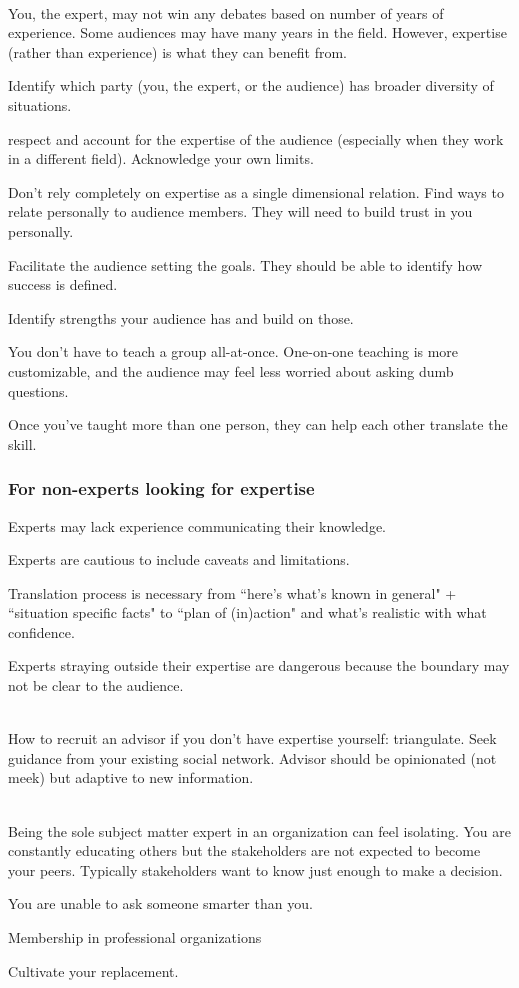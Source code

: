 \ \\

You, the expert, may not win any debates based on number of years of experience. Some audiences may have many years in the field. However, expertise (rather than experience) is what they can benefit from. 

Identify which party (you, the expert, or the audience) has broader diversity of situations.

respect and account for the expertise of the audience (especially when they work in a different field). Acknowledge your own limits.

Don't rely completely on expertise as a single dimensional relation. Find ways to relate personally to audience members. They will need to build trust in you personally.

Facilitate the audience setting the goals. They should be able to identify how success is defined.

Identify strengths your audience has and build on those.

You don't have to teach a group all-at-once. One-on-one teaching is more customizable, and the audience may feel less worried about asking dumb questions.

Once you've taught more than one person, they can help each other translate the skill. 


\subsubsection{For non-experts looking for expertise}

Experts may lack experience communicating their knowledge. 

Experts are cautious to include caveats and limitations.

Translation process is necessary from ``here's what's known in general" + ``situation specific facts" to ``plan of (in)action" and what's realistic with what confidence. 

Experts straying outside their expertise are dangerous because the boundary may not be clear to the audience.

\ \\

How to recruit an advisor if you don't have expertise yourself: triangulate. Seek guidance from your existing social network. Advisor should be opinionated (not meek) but adaptive to new information. 

\ \\

Being the sole subject matter expert in an organization can feel isolating. You are constantly educating others but the stakeholders are not expected to become your peers. Typically stakeholders want to know just enough to make a decision. 

You are unable to ask someone smarter than you. 

Membership in professional organizations

Cultivate your replacement. 